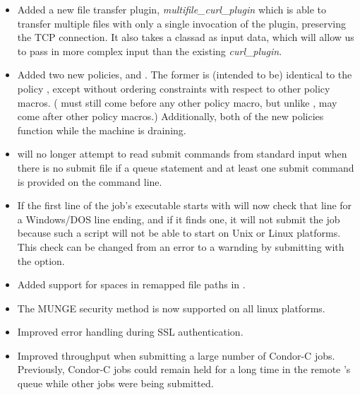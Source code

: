 \begin{itemize}

\item Added a new file transfer plugin, \emph{multifile\_curl\_plugin} which is
able to transfer multiple files with only a single invocation of the plugin, 
preserving the TCP connection. It also takes a classad as input data, which will 
allow us to pass in more complex input than the existing \emph{curl\_plugin}.

\item Added two new policies,  and
.  The former is (intended to be)
identical to the policy , except without
ordering constraints with respect to other policy macros.
( must still come before any other policy macro,
but unlike ,
 may come after other policy macros.)
Additionally, both of the new policies function while the machine is draining.

\item {} will no longer attempt to read submit commands from standard input
when there is no submit file if a queue statement and at least one submit command
is provided on the command line.

\item If the first line of the job's executable starts with \Expr{\#!}
 will now check that line for a Windows/DOS line ending, and if it finds
one, it will not submit the job because such a script will not be able to start on Unix
or Linux platforms.  This check can be changed from an error to a warnding by submitting
with the  option.

\item Added support for spaces in remapped file paths in .

\item The MUNGE security method is now supported on all linux platforms.

\item Improved error handling during SSL authentication.

\item Improved throughput when submitting a large number of Condor-C jobs.
Previously, Condor-C jobs could remain held for a long time in the remote
's queue while other jobs were being submitted.


\end{itemize}
